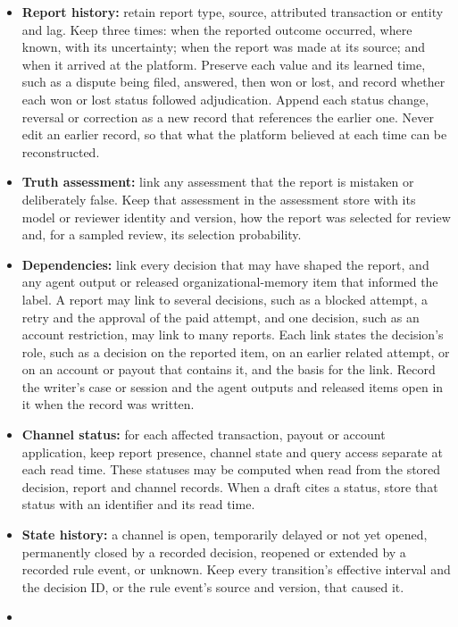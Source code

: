 \documentclass[
  11pt,
]{article}
\providecommand{\tightlist}{%
  \setlength{\itemsep}{0pt}\setlength{\parskip}{0pt}}
\renewcommand{\tightlist}{\setlength{\itemsep}{0pt plus 1pt}\setlength{\parskip}{0pt}}
\begin{document}
\begin{itemize}
\tightlist
\item
  \textbf{Report history:} retain report type, source, attributed
  transaction or entity and lag. Keep three times: when the reported
  outcome occurred, where known, with its uncertainty; when the report
  was made at its source; and when it arrived at the platform. Preserve
  each value and its learned time, such as a dispute being filed,
  answered, then won or lost, and record whether each won or lost status
  followed adjudication. Append each status change, reversal or
  correction as a new record that references the earlier one. Never edit
  an earlier record, so that what the platform believed at each time can
  be reconstructed.
\item
  \textbf{Truth assessment:} link any assessment that the report is
  mistaken or deliberately false. Keep that assessment in the assessment
  store with its model or reviewer identity and version, how the report
  was selected for review and, for a sampled review, its selection
  probability.
\item
  \textbf{Dependencies:} link every decision that may have shaped the
  report, and any agent output or released organizational-memory item
  that informed the label. A report may link to several decisions, such
  as a blocked attempt, a retry and the approval of the paid attempt,
  and one decision, such as an account restriction, may link to many
  reports. Each link states the decision's role, such as a decision on
  the reported item, on an earlier related attempt, or on an account or
  payout that contains it, and the basis for the link. Record the
  writer's case or session and the agent outputs and released items open
  in it when the record was written.
\item
  \textbf{Channel status:} for each affected transaction, payout or
  account application, keep report presence, channel state and query
  access separate at each read time. These statuses may be computed when
  read from the stored decision, report and channel records. When a
  draft cites a status, store that status with an identifier and its
  read time.
\item
  \textbf{State history:} a channel is open, temporarily delayed or not
  yet opened, permanently closed by a recorded decision, reopened or
  extended by a recorded rule event, or unknown. Keep every transition's
  effective interval and the decision ID, or the rule event's source and
  version, that caused it.
\item

\end{itemize}
\end{document}
